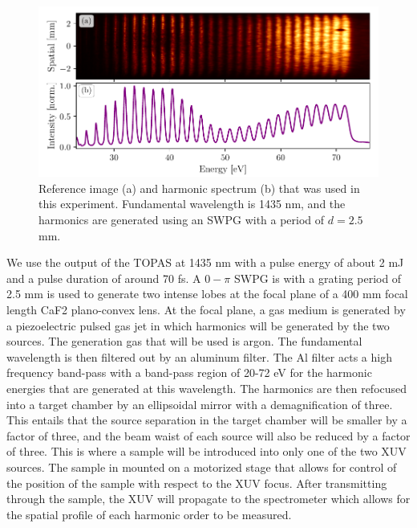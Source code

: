 \begin{figure}
	\centering
	\includegraphics[width=1.0\textwidth]{figures/refractive_index/reference_img_spectrum.pdf}
	\caption[Reference image and spectrum of harmonics used to measure refractive index using SWPG]{Reference image (a) and harmonic spectrum (b) that was used in this experiment.  Fundamental wavelength is 1435 nm, and the harmonics are generated using an SWPG with a period of $d=2.5$ mm.}
	\label{fig:ref_img_spec}
\end{figure}
We use the output of the TOPAS at 1435 nm with a pulse energy of about 2 mJ and a pulse duration of around 70 fs. A $0-\pi$ SWPG is with a grating period of 2.5 mm is used to generate two intense lobes at the focal plane of a 400 mm focal length CaF2 plano-convex lens. At the focal plane, a gas medium is generated by a piezoelectric pulsed gas jet in which harmonics will be generated by the two sources.  The generation gas that will be used is argon. The fundamental wavelength is then filtered out by an aluminum filter.  The Al filter acts a high frequency band-pass with a band-pass region of 20-72 eV for the harmonic energies that are generated at this wavelength.  The harmonics are then refocused into a target chamber by an ellipsoidal mirror with a demagnification of three.  This entails that the source separation in the target chamber will be smaller by a factor of three, and the beam waist of each source will also be reduced by a factor of three.  This is where a sample will be introduced into only one of the two XUV sources. The sample in mounted on a motorized stage that allows for control of the position of the sample with respect to the XUV focus. After transmitting through the sample, the XUV will propagate to the spectrometer which allows for the spatial profile of each harmonic order to be measured.

